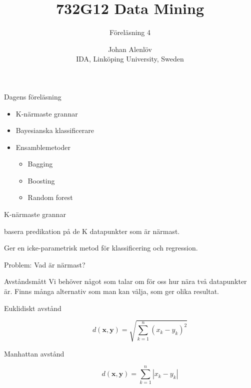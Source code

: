 \documentclass[10pt,english]{beamer}
\title{732G12 Data Mining}
\subtitle{Föreläsning 4}
\date{}
\author{Johan Alenlöv \\ IDA, Linköping University, Sweden}
\begin{document}
\maketitle

\begin{frame}{Dagens föreläsning}

    \begin{itemize}
        \item K-närmaste grannar
        \item Bayesianska klassificerare
        \item Ensamblemetoder
        \begin{itemize}
            \item Bagging
            \item Boosting
            \item Random forest
        \end{itemize}
    \end{itemize}
    
\end{frame}


\begin{frame}{K-närmaste grannar}
    \begin{greenbox}
         basera predikation på de K datapunkter som är närmast.
   \end{greenbox}

   Ger en icke-parametrisk metod för klassificering och regression.

   Problem: Vad är närmast?
\end{frame}

\begin{frame}{Avståndsmått}
    Vi behöver något som talar om för oss hur nära två datapunkter är. Finns många alternativ som man kan välja, som ger olika resultat.

    \begin{description}
        \item[Euklidiskt avstånd]
        \begin{equation*}
            d(\mathbf{x},\mathbf{y}) = \sqrt{\sum_{k=1}^{n} (x_k - y_k)^2}
        \end{equation*}
        \item[Manhattan avstånd] 
        \begin{equation*}
            d(\mathbf{x},\mathbf{y}) = \sum_{k=1}^{n} | x_k - y_k |
        \end{equation*}
    \end{description}
\end{frame}
\end{document}
